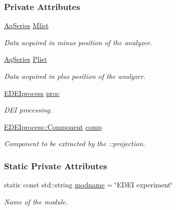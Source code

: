 \subsubsection*{Private Attributes}
\begin{DoxyCompactItemize}
\item 
\hyperlink{classAqSeries}{AqSeries} \hyperlink{classEDEIexp_a2a50bb3a6dec03af81b4a81d26076cb8}{Mlist}
\begin{DoxyCompactList}\small\item\em Data acquired in minus position of the analyzer. \item\end{DoxyCompactList}\item 
\hyperlink{classAqSeries}{AqSeries} \hyperlink{classEDEIexp_a543188a600c7951ad9c25c2fb3c1561f}{Plist}
\begin{DoxyCompactList}\small\item\em Data acquired in plus position of the analyzer. \item\end{DoxyCompactList}\item 
\hyperlink{classEDEIprocess}{EDEIprocess} \hyperlink{classEDEIexp_a7aa29e6b8cac9a1df353717768bd6900}{proc}
\begin{DoxyCompactList}\small\item\em DEI processing. \item\end{DoxyCompactList}\item 
\hyperlink{classEDEIprocess_a745d55d7f97f3aafa52998d49d9acde4}{EDEIprocess::Component} \hyperlink{classEDEIexp_aac525f5702a63162fcf932c22887d38d}{comp}
\begin{DoxyCompactList}\small\item\em Component to be extracted by the ::projection. \item\end{DoxyCompactList}\end{DoxyCompactItemize}
\subsubsection*{Static Private Attributes}
\begin{DoxyCompactItemize}
\item 
static const std::string \hyperlink{group__edeiedei_ga6dfda2e4cb9d61720e2db926b65d6dbe}{modname} = \char`\"{}EDEI experiment\char`\"{}
\begin{DoxyCompactList}\small\item\em Name of the module. \item\end{DoxyCompactList}\end{DoxyCompactItemize}


